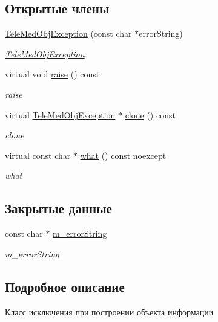 \subsection*{Открытые члены}
\begin{DoxyCompactItemize}
\item 
\hyperlink{classTeleMedObjException_a351ba22504a9acf7ed560fd6659013da}{Tele\+Med\+Obj\+Exception} (const char $\ast$error\+String)
\begin{DoxyCompactList}\small\item\em \hyperlink{classTeleMedObjException}{Tele\+Med\+Obj\+Exception}. \end{DoxyCompactList}\item 
virtual void \hyperlink{classTeleMedObjException_a367ddc1ca442487da31f7557bd4bc6ff}{raise} () const
\begin{DoxyCompactList}\small\item\em raise \end{DoxyCompactList}\item 
virtual \hyperlink{classTeleMedObjException}{Tele\+Med\+Obj\+Exception} $\ast$ \hyperlink{classTeleMedObjException_a32f7656b034f2a49c7622def17ff8b63}{clone} () const
\begin{DoxyCompactList}\small\item\em clone \end{DoxyCompactList}\item 
virtual const char $\ast$ \hyperlink{classTeleMedObjException_a4d0745f8597c3273301fa88000e35cd8}{what} () const noexcept
\begin{DoxyCompactList}\small\item\em what \end{DoxyCompactList}\end{DoxyCompactItemize}
\subsection*{Закрытые данные}
\begin{DoxyCompactItemize}
\item 
const char $\ast$ \hyperlink{classTeleMedObjException_a91ff803c7abad201ad2bb96a2149ea5e}{m\+\_\+error\+String}
\begin{DoxyCompactList}\small\item\em m\+\_\+error\+String \end{DoxyCompactList}\end{DoxyCompactItemize}


\subsection{Подробное описание}
Класс исключения при построении объекта информации 

